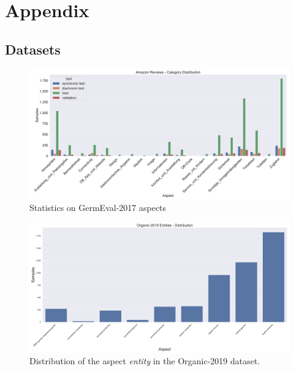 \chapter{Appendix}

\section{Datasets}

\begin{figure}[ht]
	\centering
	\includegraphics[width=\textwidth]{figures/08_appendix/08_germevalAspects}
	\caption{Statistics on GermEval-2017 aspects}
	\label{fig:08_germEvalStatistics}
\end{figure}


\begin{figure}[ht]
	\centering
	\includegraphics[width=\textwidth]{figures/05_setup/05_organicEntities}

	\caption{Distribution of the aspect \textit{entity} in the Organic-2019 dataset.}
	\label{fig:05_organic2019_Entities}
\end{figure}

